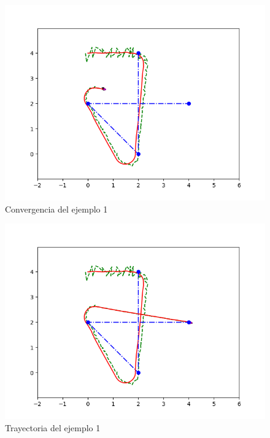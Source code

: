 \begin{figure}[htb]
  \centering
  \includegraphics[width=.8\linewidth]{images/filtro4.png}
  \caption{Convergencia del ejemplo 1}
  \label{fig:ejemplo4}
\end{figure}
\begin{figure}[htb]
  \centering
  \includegraphics[width=.8\linewidth]{images/filtro5.png}
  \caption{Trayectoria del ejemplo 1}
  \label{fig:ejemplo5}
\end{figure}
